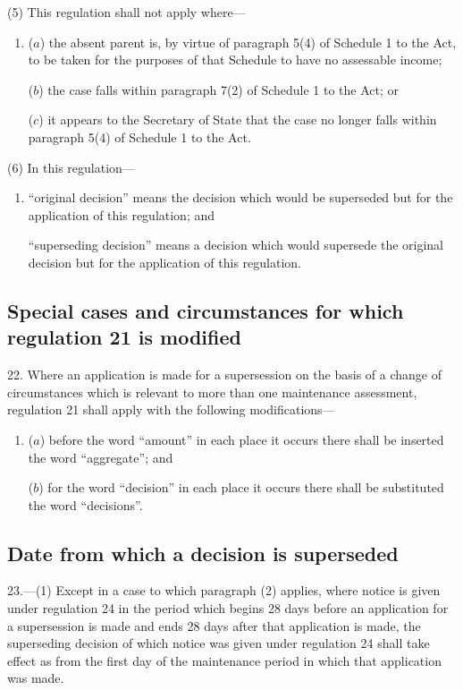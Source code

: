 \documentclass[a4paper,12pt]{article}
\begin{document}
(5) This regulation shall not apply where---
\begin{enumerate}\item[]
($a$) the absent parent is, by virtue of paragraph 5(4) of Schedule 1 to the Act, to be taken for the purposes of that Schedule to have no assessable income;

($b$) the case falls within paragraph 7(2) of Schedule 1 to the Act; or

($c$) it appears to the Secretary of State that the case no longer falls within paragraph 5(4) of Schedule 1 to the Act.
\end{enumerate}

(6) In this regulation---
\begin{enumerate}\item[]
“original decision” means the decision which would be superseded but for the application of this regulation; and

“superseding decision” means a decision which would supersede the original decision but for the application of this regulation.
\end{enumerate}

\subsection[22. Special cases and circumstances for which regulation 21 is modified]{Special cases and circumstances for which regulation 21 is modified}

22.  Where an application is made for a supersession on the basis of a change of circumstances which is relevant to more than one maintenance assessment, regulation 21 shall apply with the following modifications---
\begin{enumerate}\item[]
($a$) before the word “amount” in each place it occurs there shall be inserted the word “aggregate”; and

($b$) for the word “decision” in each place it occurs there shall be substituted the word “decisions”.
\end{enumerate}

\subsection[23. Date from which a decision is superseded]{Date from which a decision is superseded}

23.—(1) Except in a case to which paragraph (2) applies, where notice is given under regulation 24 in the period which begins 28 days before an application for a supersession is made and ends 28 days after that application is made, the superseding decision of which notice was given under regulation 24 shall take effect as from the first day of the maintenance period in which that application was made.
\end{document}
